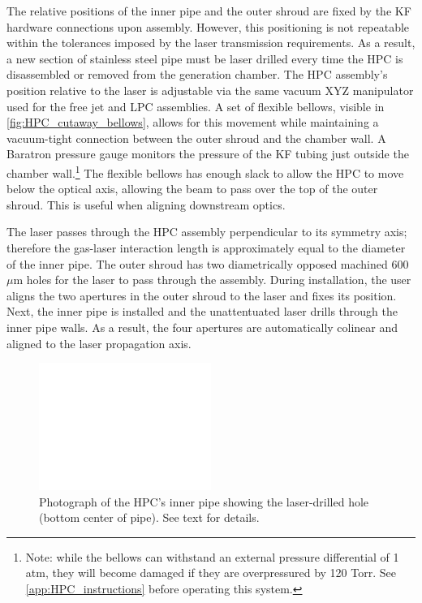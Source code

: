 The relative positions of the inner pipe and the outer shroud are fixed by the KF hardware connections upon assembly. However, this positioning is not repeatable within the tolerances imposed by the laser transmission requirements. As a result, a new section of stainless steel pipe must be laser drilled every time the HPC is disassembled or removed from the generation chamber. The HPC assembly's position relative to the laser is adjustable via the same vacuum XYZ manipulator used for the free jet and LPC assemblies. A set of flexible bellows, visible in \cref{fig:HPC_cutaway_bellows}, allows for this movement while maintaining a vacuum-tight connection between the outer shroud and the chamber wall. A Baratron pressure gauge monitors the pressure of the KF tubing just outside the chamber wall.\footnote{Note: while the bellows can withstand an external pressure differential of 1 atm, they will become damaged if they are overpressured by 120 Torr. See \cref{app:HPC_instructions} before operating this system.} The flexible bellows has enough slack to allow the HPC to move below the optical axis, allowing the beam to pass over the top of the outer shroud. This is useful when aligning downstream optics.

The laser passes through the HPC assembly perpendicular to its symmetry axis; therefore the gas-laser interaction length is approximately equal to the diameter of the inner pipe. The outer shroud has two diametrically opposed machined 600 $\mu$m holes for the laser to pass through the assembly. During installation, the user aligns the two apertures in the outer shroud to the laser and fixes its position. Next, the inner pipe is installed and the unattentuated laser drills through the inner pipe walls. As a result, the four apertures are automatically colinear and aligned to the laser propagation axis.

\begin{figure}
	\centering
	\includegraphics[width=0.5\textwidth]{figures/chap3/HPC_laserhole_500x370.png}
	\caption{Photograph of the HPC's inner pipe showing the laser-drilled hole (bottom center of pipe). See text for details.}
	\label{fig:HPC_laserhole}
\end{figure}

